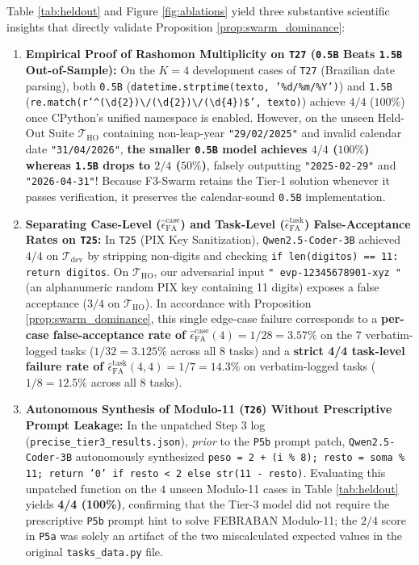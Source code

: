 \documentclass[10pt,a4paper]{article}
\begin{document}
Table \ref{tab:heldout} and Figure \ref{fig:ablations} yield three substantive scientific insights that directly validate Proposition \ref{prop:swarm_dominance}:
\begin{enumerate}
    \item \textbf{Empirical Proof of Rashomon Multiplicity on \texttt{T27} (\texttt{0.5B} Beats \texttt{1.5B} Out-of-Sample):} On the $K=4$ development cases of \texttt{T27} (Brazilian date parsing), both \texttt{0.5B} (\texttt{datetime.strptime(texto, '\%d/\%m/\%Y')}) and \texttt{1.5B} (\texttt{re.match(r'\^{}(\textbackslash d\{2\})\textbackslash /(\textbackslash d\{2\})\textbackslash /(\textbackslash d\{4\})\$', texto)}) achieve $4/4$ ($100\%$) once CPython's unified namespace is enabled. However, on the unseen Held-Out Suite $\mathcal{T}_{\text{HO}}$ containing non-leap-year \texttt{"29/02/2025"} and invalid calendar date \texttt{"31/04/2026"}, \textbf{the smaller \texttt{0.5B} model achieves $4/4$ ($100\%$) whereas \texttt{1.5B} drops to $2/4$ ($50\%$)}, falsely outputting \texttt{"2025-02-29"} and \texttt{"2026-04-31"}! Because F3-Swarm retains the Tier-1 solution whenever it passes verification, it preserves the calendar-sound \texttt{0.5B} implementation.
    \item \textbf{Separating Case-Level ($\hat{\epsilon}_{\text{FA}}^{\text{case}}$) and Task-Level ($\hat{\epsilon}_{\text{FA}}^{\text{task}}$) False-Acceptance Rates on \texttt{T25}:} In \texttt{T25} (PIX Key Sanitization), \texttt{Qwen2.5-Coder-3B} achieved $4/4$ on $\mathcal{T}_{\text{dev}}$ by stripping non-digits and checking \texttt{if len(digitos) == 11: return digitos}. On $\mathcal{T}_{\text{HO}}$, our adversarial input \texttt{"  evp-12345678901-xyz  "} (an alphanumeric random PIX key containing 11 digits) exposes a false acceptance ($3/4$ on $\mathcal{T}_{\text{HO}}$). In accordance with Proposition \ref{prop:swarm_dominance}, this single edge-case failure corresponds to a \textbf{per-case false-acceptance rate of $\hat{\epsilon}_{\text{FA}}^{\text{case}}(4) = 1/28 = 3.57\%$} on the $7$ verbatim-logged tasks ($1/32 = 3.125\%$ across all $8$ tasks) and a \textbf{strict 4/4 task-level failure rate of $\hat{\epsilon}_{\text{FA}}^{\text{task}}(4,4) = 1/7 = 14.3\%$} on verbatim-logged tasks ($1/8 = 12.5\%$ across all $8$ tasks).
    \item \textbf{Autonomous Synthesis of Modulo-11 (\texttt{T26}) Without Prescriptive Prompt Leakage:} In the unpatched Step 3 log (\texttt{precise\_tier3\_results.json}), \emph{prior} to the \texttt{P5b} prompt patch, \texttt{Qwen2.5-Coder-3B} autonomously synthesized \texttt{peso = 2 + (i \% 8); resto = soma \% 11; return '0' if resto < 2 else str(11 - resto)}. Evaluating this unpatched function on the $4$ unseen Modulo-11 cases in Table \ref{tab:heldout} yields \textbf{4/4 (100\%)}, confirming that the Tier-3 model did not require the prescriptive \texttt{P5b} prompt hint to solve FEBRABAN Modulo-11; the $2/4$ score in \texttt{P5a} was solely an artifact of the two miscalculated expected values in the original \texttt{tasks\_data.py} file.
\end{enumerate}
\end{document}
